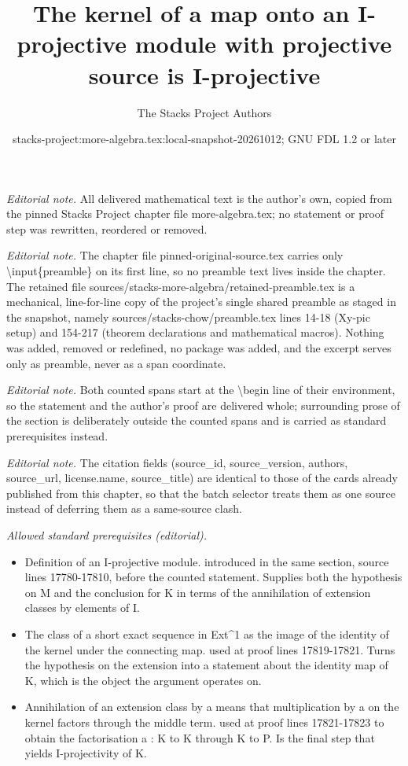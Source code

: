\documentclass[10pt,a4paper]{amsart}
\title{The kernel of a map onto an I-projective module with projective source is I-projective}
\author{The Stacks Project Authors}
\date{stacks-project:more-algebra.tex:local-snapshot-20261012; GNU FDL 1.2 or later}
\theoremstyle{plain}
\theoremstyle{definition}
\theoremstyle{remark}
\numberwithin{equation}{subsection}
\begin{document}
\maketitle
\setcounter{subsection}{1}
\noindent\textit{Editorial note.} All delivered mathematical text is the author's own, copied from the pinned Stacks Project chapter file more-algebra.tex; no statement or proof step was rewritten, reordered or removed.\par\medskip
\noindent\textit{Editorial note.} The chapter file pinned-original-source.tex carries only \textbackslash{}input\{preamble\} on its first line, so no preamble text lives inside the chapter. The retained file sources/stacks-more-algebra/retained-preamble.tex is a mechanical, line-for-line copy of the project's single shared preamble as staged in the snapshot, namely sources/stacks-chow/preamble.tex lines 14-18 (Xy-pic setup) and 154-217 (theorem declarations and mathematical macros). Nothing was added, removed or redefined, no package was added, and the excerpt serves only as preamble, never as a span coordinate.\par\medskip
\noindent\textit{Editorial note.} Both counted spans start at the \textbackslash{}begin line of their environment, so the statement and the author's proof are delivered whole; surrounding prose of the section is deliberately outside the counted spans and is carried as standard prerequisites instead.\par\medskip
\noindent\textit{Editorial note.} The citation fields (source\_id, source\_version, authors, source\_url, license.name, source\_title) are identical to those of the cards already published from this chapter, so that the batch selector treats them as one source instead of deferring them as a same-source clash.\par\medskip
\noindent\textit{Allowed standard prerequisites (editorial).}\begin{itemize}
\item Definition of an I-projective module. introduced in the same section, source lines 17780-17810, before the counted statement. Supplies both the hypothesis on M and the conclusion for K in terms of the annihilation of extension classes by elements of I.
\item The class of a short exact sequence in Ext\textasciicircum{}1 as the image of the identity of the kernel under the connecting map. used at proof lines 17819-17821. Turns the hypothesis on the extension into a statement about the identity map of K, which is the object the argument operates on.
\item Annihilation of an extension class by a means that multiplication by a on the kernel factors through the middle term. used at proof lines 17821-17823 to obtain the factorisation a : K to K through K to P. Is the final step that yields I-projectivity of K.
\end{itemize}\medskip
\end{document}
